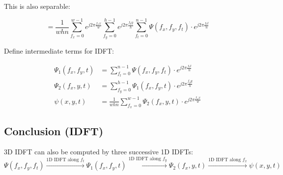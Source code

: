 \documentclass{article}
\begin{document}
This is also separable:

\[
= \frac{1}{whn} \sum_{f_x=0}^{w-1} e^{j 2\pi \frac{f_x x}{w}}
\sum_{f_y=0}^{h-1} e^{j 2\pi \frac{f_y y}{h}}
\sum_{f_t=0}^{n-1} \Psi(f_x, f_y, f_t) \cdot e^{j 2\pi \frac{f_t t}{n}}
\]

Define intermediate terms for IDFT:

\begin{align*}
\Psi_1(f_x, f_y, t) &= \sum_{f_t=0}^{n-1} \Psi(f_x, f_y, f_t) \cdot e^{j 2\pi \frac{f_t t}{n}} \\
\Psi_2(f_x, y, t) &= \sum_{f_y=0}^{h-1} \Psi_1(f_x, f_y, t) \cdot e^{j 2\pi \frac{f_y y}{h}} \\
\psi(x, y, t) &= \frac{1}{whn} \sum_{f_x=0}^{w-1} \Psi_2(f_x, y, t) \cdot e^{j 2\pi \frac{f_x x}{w}}
\end{align*}

\subsection*{Conclusion (IDFT)}

3D IDFT can also be computed by three successive 1D IDFTs:
\[
\Psi(f_x, f_y, f_t) \xrightarrow{\text{1D IDFT along } f_t} \Psi_1(f_x, f_y, t)
\xrightarrow{\text{1D IDFT along } f_y} \Psi_2(f_x, y, t)
\xrightarrow{\text{1D IDFT along } f_x} \psi(x, y, t)
\]
\end{document}
